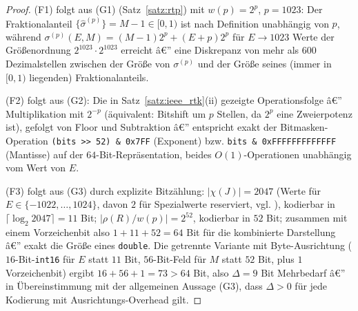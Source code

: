 ﻿\documentclass[a4paper,12pt]{article}
\theoremstyle{definition}
\begin{document}
\begin{proof}
	(F1) folgt aus (G1) (Satz~\ref{satz:rtp}) mit $w(p)=2^p$,
	$p=1023$: Der Fraktionalanteil $\{\hat\sigma^{(p)}\}=M-1\in[0,1)$ ist
	nach Definition unabhängig von $p$, während
	$\sigma^{(p)}(E,M)=(M-1)2^p+(E+p)2^p$ für $E\to1023$ Werte der
	Größenordnung $2^{1023}\cdot2^{1023}$ erreicht â€” eine Diskrepanz von
	mehr als $600$ Dezimalstellen zwischen der Größe von $\sigma^{(p)}$ und
	der Größe seines (immer in $[0,1)$ liegenden) Fraktionalanteils.

	(F2) folgt aus (G2): Die in Satz~\ref{satz:ieee_rtk}(ii) gezeigte
	Operationsfolge â€” Multiplikation mit $2^{-p}$ (äquivalent: Bitshift um
	$p$ Stellen, da $2^p$ eine Zweierpotenz ist), gefolgt von Floor und
	Subtraktion â€” entspricht exakt der Bitmasken-Operation
	\texttt{(bits >> 52) \& 0x7FF} (Exponent) bzw.
	\texttt{bits \& 0xFFFFFFFFFFFFF} (Mantisse) auf der $64$-Bit-Repräsentation,
	beides $O(1)$-Operationen unabhängig vom Wert von $E$.

	(F3) folgt aus (G3) durch explizite Bitzählung: $|\chi(J)|=2047$
	(Werte für $E\in\{-1022,\ldots,1024\}$, davon $2$ für Spezialwerte
	reserviert, vgl. \cite{ieee754}), kodierbar in $\lceil\log_2 2047\rceil=11$
	Bit; $|\rho(R)/w(p)|=2^{52}$, kodierbar in $52$ Bit; zusammen mit
	einem Vorzeichenbit also $1+11+52=64$ Bit für die kombinierte
	Darstellung â€” exakt die Größe eines \texttt{double}. Die getrennte
	Variante mit Byte-Ausrichtung ($16$-Bit-\texttt{int16} für $E$ statt
	$11$ Bit, $56$-Bit-Feld für $M$ statt $52$ Bit, plus $1$ Vorzeichenbit)
	ergibt $16+56+1=73>64$ Bit, also $\Delta=9$ Bit Mehrbedarf â€” in
	Übereinstimmung mit der allgemeinen Aussage (G3), dass
	$\Delta>0$ für jede Kodierung mit Ausrichtungs-Overhead gilt. \qedhere
\end{proof}
\end{document}
